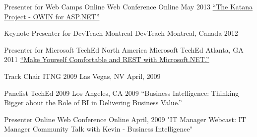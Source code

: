 


\begin{cventries}


\cventry
{Presenter for Web Camps}
{Online Web Conference}
{Online}
{May 2013}
{
  \href{https://channel9.msdn.com/Shows/Web+Camps+TV/The-Katana-Project-OWIN-for-ASPNET}{“The Katana Project - OWIN for ASP.NET”}
}


\cventry
{Keynote Presenter for DevTeach Montreal}
{DevTeach}
{Montreal, Canada}
{2012}
{
}


\cventry
{Presenter for Microsoft TechEd North America}
{Microsoft TechEd}
{Atlanta, GA}
{2011}
{
  \href{http://channel9.msdn.com/Events/TechEd/NorthAmerica/2011/MID307}{“Make Yourself Comfortable and REST with Microsoft.NET.”}
}


\cventry
{Track Chair}
{ITNG 2009}
{Las Vegas, NV}
{April, 2009}
{
}


\cventry
{Panelist}
{TechEd 2009}
{Los Angeles, CA}
{2009}
{
  “Business Intelligence: Thinking Bigger about the Role of BI in Delivering Business Value.”
}



\cventry
{Presenter}
{Online Web Conference}
{Online}
{April, 2009}
{
  "IT Manager Webcast: IT Manager Community Talk with Kevin - Business Intelligence"  
}


\end{cventries}